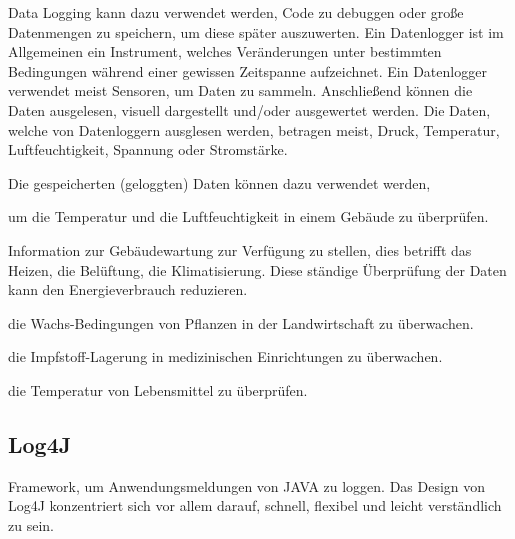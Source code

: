 
Data Logging kann dazu verwendet werden, Code zu debuggen oder große Datenmengen zu speichern, um diese später auszuwerten. Ein Datenlogger ist im Allgemeinen ein Instrument, welches Veränderungen unter bestimmten Bedingungen während einer gewissen Zeitspanne aufzeichnet. Ein Datenlogger verwendet meist Sensoren, um Daten zu sammeln. Anschließend können die Daten ausgelesen, visuell dargestellt und/oder ausgewertet werden. Die Daten, welche von Datenloggern ausglesen werden, betragen meist, Druck, Temperatur, Luftfeuchtigkeit, Spannung oder Stromstärke. 

Die gespeicherten (geloggten) Daten können dazu verwendet werden, 

\begin{compactitem}
    \item um die Temperatur und die Luftfeuchtigkeit in einem Gebäude zu überprüfen.
    \item Information zur Gebäudewartung zur Verfügung zu stellen, dies betrifft das Heizen, die Belüftung, die Klimatisierung. Diese ständige Überprüfung der Daten kann den Energieverbrauch reduzieren.
    \item die Wachs-Bedingungen von Pflanzen in der Landwirtschaft zu überwachen. 
    \item die Impfstoff-Lagerung in medizinischen Einrichtungen zu überwachen. 
    \item die Temperatur von Lebensmittel zu überprüfen.
\end{compactitem}


\subsection{Log4J}
Framework, um Anwendungsmeldungen von JAVA zu loggen.
Das Design von Log4J konzentriert sich vor allem darauf, schnell, flexibel und leicht verständlich zu sein. 

